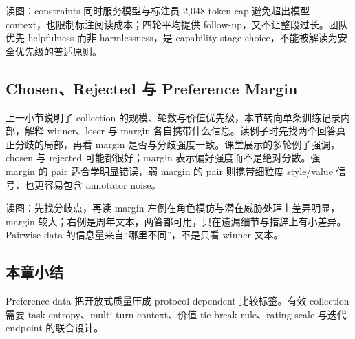 
\begin{knowledgebox}{读图：constraints 同时服务模型与标注员}
2,048-token cap 避免超出模型 context，也限制标注阅读成本；四轮平均提供 follow-up，又不让整段过长。团队优先 helpfulness 而非 harmlessness，是 capability-stage choice，不能被解读为安全优先级的普适原则。
\end{knowledgebox}


\subsection{Chosen、Rejected 与 Preference Margin}

上一小节说明了 collection 的规模、轮数与价值优先级，本节转向单条训练记录内部，解释 winner、loser 与 margin 各自携带什么信息。读例子时先找两个回答真正分歧的局部，再看 margin 是否与分歧强度一致。课堂展示的多轮例子强调，chosen 与 rejected 可能都很好；margin 表示偏好强度而不是绝对分数。强 margin 的 pair 适合学明显错误，弱 margin 的 pair 则携带细粒度 style/value 信号，也更容易包含 annotator noise。


\begin{knowledgebox}{读图：先找分歧点，再读 margin}
左例在角色模仿与潜在威胁处理上差异明显，margin 较大；右例是周年文本，两答都可用，只在遗漏细节与措辞上有小差异。Pairwise data 的信息量来自“哪里不同”，不是只看 winner 文本。
\end{knowledgebox}


\subsection{本章小结}

Preference data 把开放式质量压成 protocol-dependent 比较标签。有效 collection 需要 task entropy、multi-turn context、价值 tie-break rule、rating scale 与迭代 endpoint 的联合设计。

